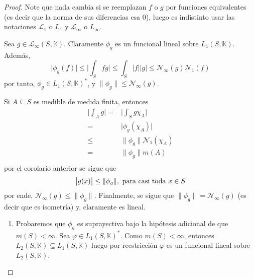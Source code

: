 \documentclass[12pt]{report}
\newcounter{it}
\theoremstyle{largebreak}
\newcommand\abs[1]{\ensuremath{\big|#1\big|}}
\newcommand\norm[1]{\ensuremath{\|#1\|}}
\newcommand{\N}[2]{\ensuremath{\mathcal{N}_{#1}\left(#2\right)}}
\begin{document}
    \begin{proof}
        Note que nada cambia si se reemplazan $f$ o $g$ por funciones equivalentes (es decir que la norma de sus diferencias esa 0), luego es indistinto usar las notaciones $\mathcal{L}_1$ o $L_1$
        y $\mathcal{L}_\infty$ o $L_\infty$.

        Sea $g\in\mathcal{L}_\infty(S,\mathbb{K})$. Claramente $\phi_g$ es un funcional lineal sobre $L_1(S,\mathbb{K})$. Además, 
        \begin{equation*}
            \abs{\phi_g(f)}\leq\abs{\int_S fg}\leq\int_S\abs{f}\abs{g}\leq \N{\infty}{g}\N{1}{f}
        \end{equation*}
        por tanto, $\phi_g\in L_1(S,\mathbb{K})^*$, y $\norm{\phi_g}\leq\N{\infty}{g}$.

        Si $A\subseteq S$ es medible de medida finita, entonces
        \begin{equation*}
            \begin{split}
                \abs{\int_A g}=&\abs{\int_S g\chi_A}\\
                =&\abs{\phi_g(\chi_A)} \\
                \leq&\norm{\phi_g}\N{1}{\chi_A} \\
                =&\norm{\phi_g}m(A)\\
            \end{split}
        \end{equation*}
        por el corolario anterior se sigue que
        \begin{equation*}
            \abs{g(x)}\leq\norm{\phi_g},\textup{ para casi toda }x\in S
        \end{equation*}
        por ende, $\N{\infty}{g}\leq\norm{\phi_g}$. Finalmente, se sigue que $\norm{\phi_g}=\N{\infty}{g}$ (es decir que es isometría) y, claramente es lineal.

        \begin{enumerate}
            \item Probaremos que $\phi_g$ es suprayectiva bajo la hipótesis adicional de que $m(S)<\infty$. Sea $\varphi\in L_1(S,\mathbb{K})^*$. Como $m(S)<\infty$, entonces $L_2(S,\mathbb{K})\subseteq L_1(S,\mathbb{K})$ luego por reestricción $\varphi$ es un funcional lineal sobre $L_2(S,\mathbb{K})$.
            

\end{enumerate}
\end{proof}
\end{document}
